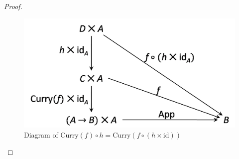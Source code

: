 \begin{proof}
\begin{figure}[h!]
\label{figure:cat_eqn2}
\end{figure}
\begin{figure}[h!]
\centering
\includegraphics[scale=0.42]{./images/cat_eqn3}
\caption{Diagram of $ \text{Curry}(f) \circ h = \text{Curry}(f \circ (h \times \text{id})) $}
\label{figure:cat_eqn3}
\end{figure}


\end{proof}
